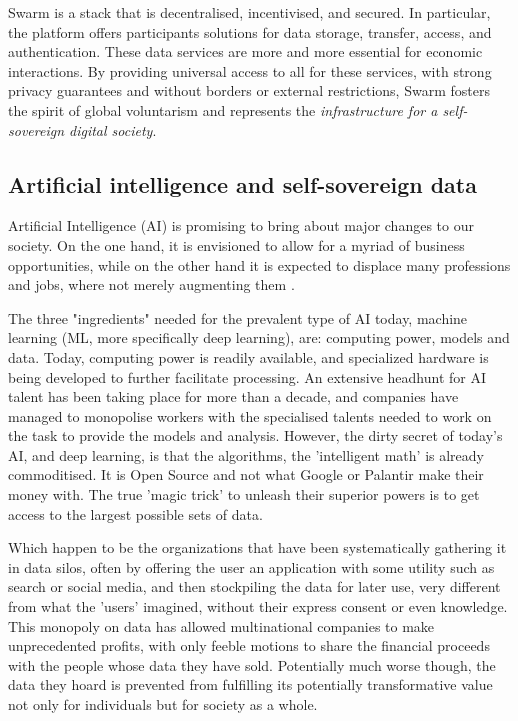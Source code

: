 Swarm is a  stack that is decentralised, incentivised, and secured. In particular, the platform offers participants solutions for data storage, transfer, access, and authentication. These data services are more and more essential for economic interactions. By providing universal access to all for these services, with strong privacy guarantees and without borders or external restrictions, Swarm fosters the spirit of global voluntarism and represents the \emph{infrastructure for a self-sovereign digital society}.

\subsection{Artificial intelligence and self-sovereign data \statusgreen} \label{sec:AIdata}

Artificial Intelligence (AI) is promising to bring about major changes to our society. On the one hand, it is envisioned to allow for a myriad of business opportunities, while on the other hand it is expected to displace many professions and jobs, where not merely augmenting them \cite{Lee2018Sep}.

The three "ingredients" needed for the prevalent type of AI today, machine learning (ML, more specifically deep learning), are: computing power, models and data. Today, computing power is readily available, and specialized hardware is being developed to further facilitate processing. An extensive headhunt for AI talent has been taking place for more than a decade, and companies have  managed to monopolise workers with the specialised talents needed to work on the task to provide the models and analysis. However, the dirty secret of today's AI, and deep learning, is that the algorithms, the 'intelligent math' is already commoditised. It is Open Source and not what Google or Palantir make their money with. The true 'magic trick' to unleash their superior powers is to get access to the largest possible sets of data.

Which happen to be the organizations that have been systematically gathering it in data silos, often by offering the user an application with some utility such as search or social media, and then stockpiling the data for later use, very different from what the 'users' imagined, without their express consent or even knowledge. This monopoly on data has allowed multinational companies to make unprecedented profits, with only feeble motions to share the financial proceeds with the people whose data they have sold. Potentially much worse though, the data they hoard is prevented from fulfilling its potentially transformative value not only for individuals but for society as a whole.

